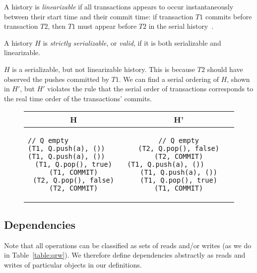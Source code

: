 \begin{defn}
A history is \emph{linearizable} if all transactions appears to occur instantaneously between their start time and their commit time: if transaction $T1$ commits before transaction $T2$, then $T1$ must appear before $T2$ in the serial history~\cite{harristm}.
\end{defn}

\begin{defn}
    A history $H$ is \emph{strictly serializable}, or \emph{valid}, if it is both serializable and linearizable. 
\end{defn}

\begin{eg}
$H$ is a serializable, but not linearizable history. This is because $T2$ should have observed the pushes committed by $T1$. We can find a serial ordering of $H$, shown in $H'$, but $H'$ violates the rule that the serial order of transactions corresponds to the real time order of the transactions' commits.
    
\begin{figure}[H]
    \centering
\singlespacing   
    \begin{tabular}{c|c}
H & H'\\
\hline
\begin{lstlisting}
// Q empty                          
(T1, Q.push(a), ())                
(T1, Q.push(a), ())               
(T1, Q.pop(), true)
(T1, COMMIT)
(T2, Q.pop(), false)
(T2, COMMIT)
\end{lstlisting} & 
\begin{lstlisting}
// Q empty
(T2, Q.pop(), false)
(T2, COMMIT)
(T1, Q.push(a), ())                       
(T1, Q.push(a), ())
(T1, Q.pop(), true)
(T1, COMMIT)
\end{lstlisting}
    \end{tabular}
\end{figure}
\end{eg}

\subsection{Dependencies}

Note that all operations can be classified as sets of reads and/or writes (as we do in Table~\ref{table:qrw}). We therefore define dependencies abstractly as reads and writes of particular objects in our definitions.

